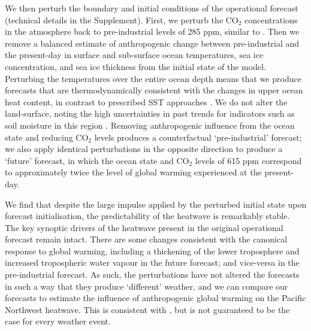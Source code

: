   We then perturb the boundary and initial conditions of the operational forecast (technical details in the Supplement). First, we perturb the CO$_2$ concentrations in the atmosphere back to pre-industrial levels of 285 ppm, similar to \cite{leach_forecast-based_2021}. Then we remove a balanced estimate of anthropogenic change between pre-industrial and the present-day in surface and sub-surface ocean temperatures, sea ice concentration, and sea ice thickness \cite{locarnini_world_2019,rayner_global_2003,zuo_ecmwf_2019} from the initial state of the model. Perturbing the temperatures over the entire ocean depth means that we produce forecasts that are thermodynamically consistent with the changes in upper ocean heat content, in contrast to prescribed SST approaches \cite{massey_weatherhome-development_2015,ciavarella_upgrade_2018}. We do not alter the land-surface, noting the high uncertainties in past trends for indicators such as soil moisture in this region \cite{masson-delmotte_water_2021,masson-delmotte_changing_2021,masson-delmotte_atlas_2021}. Removing anthropogenic influence from the ocean state and reducing CO$_2$ levels produces a counterfactual `pre-industrial' forecast; we also apply identical perturbations in the opposite direction to produce a `future' forecast, in which the ocean state and CO$_2$ levels of 615 ppm correspond to approximately twice the level of global warming experienced at the present-day.

  We find that despite the large impulse applied by the perturbed initial state upon forecast initialisation, the predictability of the heatwave is remarkably stable. The key synoptic drivers of the heatwave present in the original operational forecast remain intact. There are some changes consistent with the canonical response to global warming, including a thickening of the lower troposphere \cite{christidis_changes_2015} and increased tropospheric water vapour \cite{allen_constraints_2002} in the future forecast; and vice-versa in the pre-industrial forecast. As such, the perturbations have not altered the forecasts in such a way that they produce `different' weather, and we can compare our forecasts to estimate the influence of anthropogenic global warming on the Pacific Northwest heatwave. This is consistent with \cite{leach_forecast-based_2021}, but is not guaranteed to be the case for every weather event.

